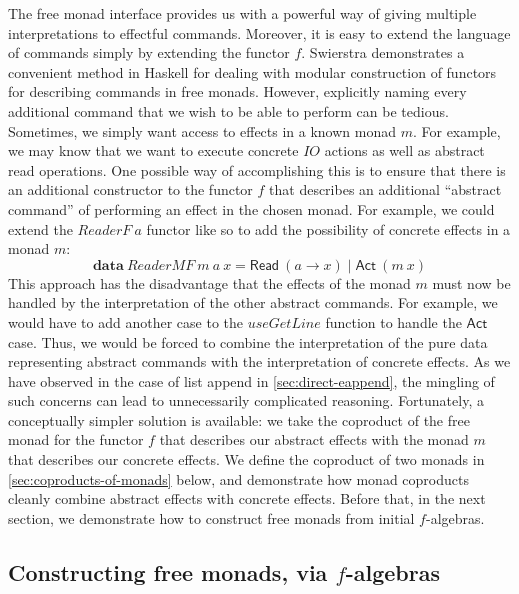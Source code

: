 \documentclass{jfp1}
\newcommand{\kw}[1]{\textbf{#1}}
\begin{document}
The free monad interface provides us with a powerful way of giving
multiple interpretations to effectful commands. Moreover, it is easy
to extend the language of commands simply by extending the functor
$f$. Swierstra \cite{swierstra08data} demonstrates a convenient method
in Haskell for dealing with modular construction of functors for
describing commands in free monads. However, explicitly naming every
additional command that we wish to be able to perform can be
tedious. Sometimes, we simply want access to effects in a known monad
$m$. For example, we may know that we want to execute concrete
$\mathit{IO}$ actions as well as abstract read operations. One
possible way of accomplishing this is to ensure that there is an
additional constructor to the functor $f$ that describes an additional
``abstract command'' of performing an effect in the chosen monad. For
example, we could extend the $\mathit{ReaderF}~a$ functor like so to
add the possibility of concrete effects in a monad $m$:
\begin{displaymath}
  \kw{data}~\mathit{ReaderMF}~m~a~x = \mathsf{Read}~(a \to x) \mathrel| \mathsf{Act}~(m~x)
\end{displaymath}
This approach has the disadvantage that the effects of the monad $m$
must now be handled by the interpretation of the other abstract
commands. For example, we would have to add another case to the
$\mathit{useGetLine}$ function to handle the $\mathsf{Act}$
case. Thus, we would be forced to combine the interpretation of the
pure data representing abstract commands with the interpretation of
concrete effects. As we have observed in the case of list append in
\autoref{sec:direct-eappend}, the mingling of such concerns can lead
to unnecessarily complicated reasoning. Fortunately, a conceptually
simpler solution is available: we take the coproduct of the free monad
for the functor $f$ that describes our abstract effects with the monad
$m$ that describes our concrete effects. We define the coproduct of
two monads in \autoref{sec:coproducts-of-monads} below, and
demonstrate how monad coproducts cleanly combine abstract effects with
concrete effects. Before that, in the next section, we demonstrate how
to construct free monads from initial $f$-algebras.

\subsection{Constructing free monads, via \texorpdfstring{$f$}{f}-algebras}
\label{sec:construct-free-monads}
\end{document}
